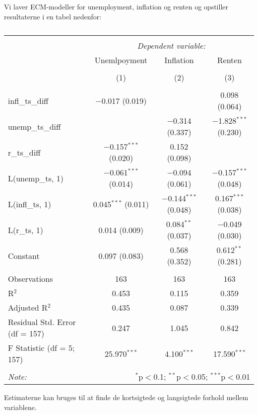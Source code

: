 \documentclass[
  10pt,
]{article}
\begin{document}
Vi laver ECM-modeller for unemployment, inflation og renten og opstiller
resultaterne i en tabel nedenfor:

\begin{table}[!htbp] \centering 
  \caption{} 
  \label{} 
\begin{tabular}{@{\extracolsep{5pt}}lccc} 
\\[-1.8ex]\hline 
\hline \\[-1.8ex] 
 & \multicolumn{3}{c}{\textit{Dependent variable:}} \\ 
\cline{2-4} 
 & Unemlpoyment & Inflation & Renten \\ 
\\[-1.8ex] & (1) & (2) & (3)\\ 
\hline \\[-1.8ex] 
 infl\_ts\_diff & $-$0.017 (0.019) &  & 0.098 (0.064) \\ 
  unemp\_ts\_diff &  & $-$0.314 (0.337) & $-$1.828$^{***}$ (0.230) \\ 
  r\_ts\_diff & $-$0.157$^{***}$ (0.020) & 0.152 (0.098) &  \\ 
  L(unemp\_ts, 1) & $-$0.061$^{***}$ (0.014) & $-$0.094 (0.061) & $-$0.157$^{***}$ (0.048) \\ 
  L(infl\_ts, 1) & 0.045$^{***}$ (0.011) & $-$0.144$^{***}$ (0.048) & 0.167$^{***}$ (0.038) \\ 
  L(r\_ts, 1) & 0.014 (0.009) & 0.084$^{**}$ (0.037) & $-$0.049 (0.030) \\ 
  Constant & 0.097 (0.083) & 0.568 (0.352) & 0.612$^{**}$ (0.281) \\ 
 \hline \\[-1.8ex] 
Observations & 163 & 163 & 163 \\ 
R$^{2}$ & 0.453 & 0.115 & 0.359 \\ 
Adjusted R$^{2}$ & 0.435 & 0.087 & 0.339 \\ 
Residual Std. Error (df = 157) & 0.247 & 1.045 & 0.842 \\ 
F Statistic (df = 5; 157) & 25.970$^{***}$ & 4.100$^{***}$ & 17.590$^{***}$ \\ 
\hline 
\hline \\[-1.8ex] 
\textit{Note:}  & \multicolumn{3}{r}{$^{*}$p$<$0.1; $^{**}$p$<$0.05; $^{***}$p$<$0.01} \\ 
\end{tabular} 
\end{table}

Estimaterne kan bruges til at finde de kortsigtede og langsigtede
forhold mellem variablene.\\
\end{document}
